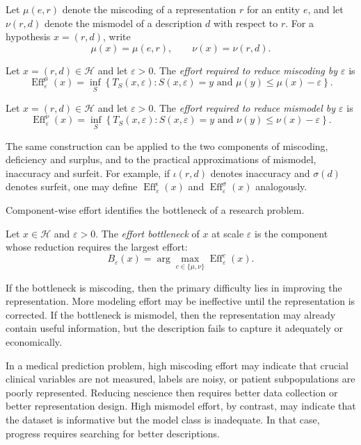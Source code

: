 Let \(\mu(e,r)\) denote the miscoding of a representation \(r\) for an entity \(e\), and let \(\nu(r,d)\) denote the mismodel of a description \(d\) with respect to \(r\). For a hypothesis \(x=(r,d)\), write
\[
\mu(x)=\mu(e,r),
\qquad
\nu(x)=\nu(r,d).
\]

\begin{definition}
Let \(x=(r,d)\in\mathcal{H}\) and let \(\varepsilon>0\). The \emph{effort required to reduce miscoding by \(\varepsilon\)} is
\[
\operatorname{Eff}^{\mu}_{\varepsilon}(x)
=
\inf_{S}
\left\{
T_S(x,\varepsilon):
S(x,\varepsilon)=y
\text{ and }
\mu(y)\leq \mu(x)-\varepsilon
\right\}.
\]
\end{definition}

\begin{definition}
Let \(x=(r,d)\in\mathcal{H}\) and let \(\varepsilon>0\). The \emph{effort required to reduce mismodel by \(\varepsilon\)} is
\[
\operatorname{Eff}^{\nu}_{\varepsilon}(x)
=
\inf_{S}
\left\{
T_S(x,\varepsilon):
S(x,\varepsilon)=y
\text{ and }
\nu(y)\leq \nu(x)-\varepsilon
\right\}.
\]
\end{definition}

The same construction can be applied to the two components of miscoding, deficiency and surplus, and to the practical approximations of mismodel, inaccuracy and surfeit. For example, if \(\iota(r,d)\) denotes inaccuracy and \(\sigma(d)\) denotes surfeit, one may define \(\operatorname{Eff}^{\iota}_{\varepsilon}(x)\) and \(\operatorname{Eff}^{\sigma}_{\varepsilon}(x)\) analogously.

Component-wise effort identifies the bottleneck of a research problem.

\begin{definition}
Let \(x\in\mathcal{H}\) and \(\varepsilon>0\). The \emph{effort bottleneck} of \(x\) at scale \(\varepsilon\) is the component whose reduction requires the largest effort:
\[
B_{\varepsilon}(x)
=
\arg\max_{c\in\{\mu,\nu\}}
\operatorname{Eff}^{c}_{\varepsilon}(x).
\]
\end{definition}

If the bottleneck is miscoding, then the primary difficulty lies in improving the representation. More modeling effort may be ineffective until the representation is corrected. If the bottleneck is mismodel, then the representation may already contain useful information, but the description fails to capture it adequately or economically.

\begin{example}
In a medical prediction problem, high miscoding effort may indicate that crucial clinical variables are not measured, labels are noisy, or patient subpopulations are poorly represented. Reducing nescience then requires better data collection or better representation design. High mismodel effort, by contrast, may indicate that the dataset is informative but the model class is inadequate. In that case, progress requires searching for better descriptions.
\end{example}

